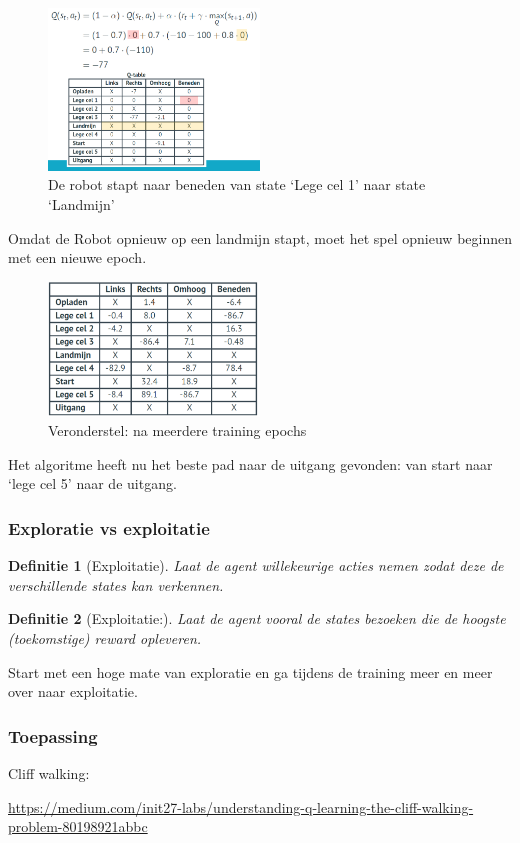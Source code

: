 \documentclass{article}
\newtheorem{theorem}{Definitie}[section]
\begin{document}
\begin{figure}[H]
    \centering
    \includegraphics[width=0.5\textwidth]{q-table8.png}
    \caption{De robot stapt naar beneden van state `Lege cel 1' naar state `Landmijn'}
\end{figure}

Omdat de Robot opnieuw op een landmijn stapt, moet het spel opnieuw beginnen met een nieuwe epoch.

\begin{figure}[H]
    \centering
    \includegraphics[width=0.5\textwidth]{q-table-epochx.png}
    \caption{Veronderstel: na meerdere training epochs}
\end{figure}

Het algoritme heeft nu het beste pad naar de uitgang gevonden: van start naar `lege cel 5' naar de uitgang.

\subsubsection{Exploratie vs exploitatie}

\begin{theorem}[Exploitatie]
    Laat de agent willekeurige acties nemen zodat deze de verschillende states kan verkennen.
\end{theorem}

\begin{theorem}[Exploitatie:]
    Laat de agent vooral de states bezoeken die de hoogste (toekomstige) reward opleveren.
\end{theorem}

Start met een hoge mate van exploratie en ga tijdens de training meer
en meer over naar exploitatie.

\subsubsection{Toepassing}

Cliff walking:

\url{https://medium.com/init27-labs/understanding-q-learning-the-cliff-walking-problem-80198921abbc}
\end{document}
